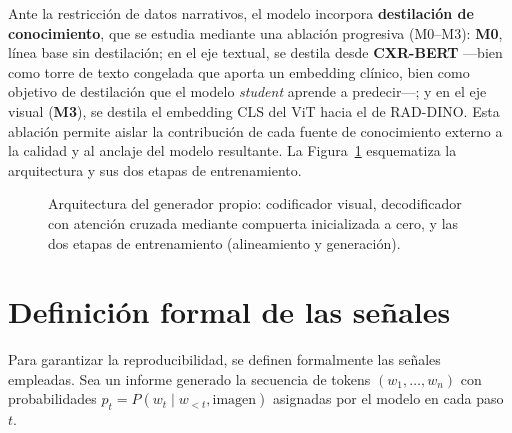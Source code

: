 Ante la restricción de datos narrativos, el modelo incorpora \textbf{destilación de conocimiento}, que
se estudia mediante una ablación progresiva (M0--M3): \textbf{M0}, línea base sin destilación; en el
eje textual, se destila desde \textbf{CXR-BERT} \parencite{boecking2022} —bien como torre de texto
congelada que aporta un embedding clínico, bien como objetivo de destilación que el modelo
\emph{student} aprende a predecir—; y en el eje visual (\textbf{M3}), se destila el embedding CLS del
ViT hacia el de RAD-DINO. Esta ablación permite aislar la contribución de cada fuente de conocimiento
externo a la calidad y al anclaje del modelo resultante. La Figura~\ref{fig:arch} esquematiza la
arquitectura y sus dos etapas de entrenamiento.

\begin{figure}[t]\centering
{}
\caption{Arquitectura del generador propio: codificador visual, decodificador con atención cruzada
mediante compuerta inicializada a cero, y las dos etapas de entrenamiento (alineamiento y generación).}
\label{fig:arch}
\end{figure}

\section{Definición formal de las señales}
Para garantizar la reproducibilidad, se definen formalmente las señales empleadas. Sea un informe
generado la secuencia de tokens $(w_1,\dots,w_n)$ con probabilidades $p_t = P(w_t \mid w_{<t},
\text{imagen})$ asignadas por el modelo en cada paso $t$.


